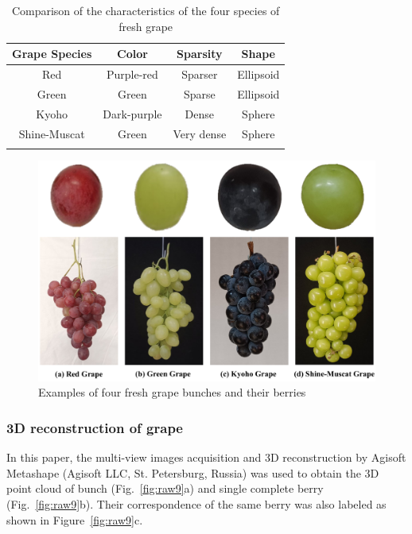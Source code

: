 \documentclass[12pt]{article}
\begin{document}
\begin{table}[h]
    \centering
    \caption{Comparison of the characteristics of the four species of fresh grape}
    \begin{tabular}{cccc}
        \hline
        \textbf{Grape Species} & \textbf{Color} & \textbf{Sparsity} & \textbf{Shape} \\
        \hline
        Red & Purple-red & Sparser & Ellipsoid \\
        Green & Green & Sparse & Ellipsoid \\
        Kyoho & Dark-purple & Dense & Sphere \\
        Shine-Muscat & Green & Very dense & Sphere \\
        \hline
    \label{tbl:1}
    \end{tabular}
\end{table}

\begin{figure}[hbt!]
    \centering
    \includegraphics[width=1\textwidth]{figures/Figure2.pdf}
    \caption{Examples of four fresh grape bunches and their berries}
    \label{fig:raw86}
\end{figure}

\subsubsection{3D reconstruction of grape}
\label{sec:212}

In this paper, the multi-view images acquisition and 3D reconstruction by Agisoft Metashape (Agisoft LLC, St. Petersburg, Russia) was used to obtain the 3D point cloud of bunch (Fig.~\ref{fig:raw9}a) and single complete berry (Fig.~\ref{fig:raw9}b). 
Their correspondence of the same berry was also labeled as shown in Figure~\ref{fig:raw9}c.
\end{document}
